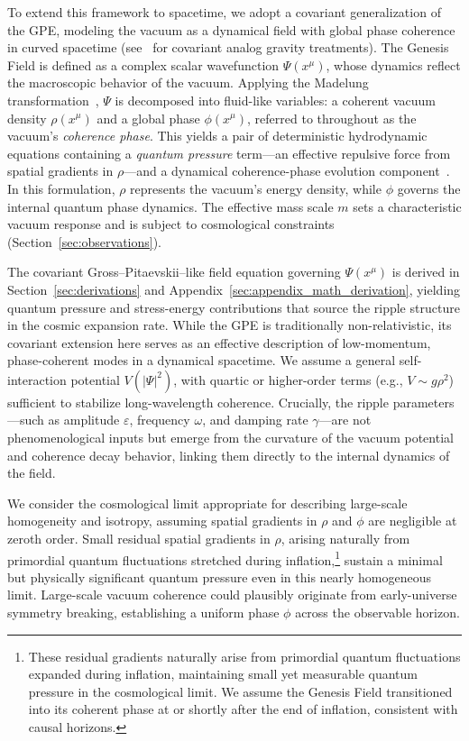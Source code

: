 To extend this framework to spacetime, we adopt a covariant generalization of the GPE, modeling the vacuum as a dynamical field with global phase coherence in curved spacetime (see~\cite{Barcelo2005,volovik2003universe} for covariant analog gravity treatments). The Genesis Field is defined as a complex scalar wavefunction \( \Psi(x^\mu) \), whose dynamics reflect the macroscopic behavior of the vacuum. Applying the Madelung transformation~\cite{Madelung1927}, \( \Psi \) is decomposed into fluid-like variables: a coherent vacuum density \( \rho(x^\mu) \) and a global phase \( \phi(x^\mu) \), referred to throughout as the vacuum’s \emph{coherence phase}. This yields a pair of deterministic hydrodynamic equations containing a \emph{quantum pressure} term—an effective repulsive force from spatial gradients in \( \rho \)—and a dynamical coherence-phase evolution component~\cite{volovik2003universe,Barcelo2005}. In this formulation, \( \rho \) represents the vacuum’s energy density, while \( \phi \) governs the internal quantum phase dynamics. The effective mass scale \( m \) sets a characteristic vacuum response and is subject to cosmological constraints (Section~\ref{sec:observations}).

The covariant Gross–Pitaevskii–like field equation governing \( \Psi(x^\mu) \) is derived in Section~\ref{sec:derivations} and Appendix~\ref{sec:appendix_math_derivation}, yielding quantum pressure and stress-energy contributions that source the ripple structure in the cosmic expansion rate. While the GPE is traditionally non-relativistic, its covariant extension here serves as an effective description of low-momentum, phase-coherent modes in a dynamical spacetime. We assume a general self-interaction potential \( V(|\Psi|^2) \), with quartic or higher-order terms (e.g., \( V \sim g \rho^2 \)) sufficient to stabilize long-wavelength coherence. Crucially, the ripple parameters—such as amplitude \( \varepsilon \), frequency \( \omega \), and damping rate \( \gamma \)—are not phenomenological inputs but emerge from the curvature of the vacuum potential and coherence decay behavior, linking them directly to the internal dynamics of the field.

We consider the cosmological limit appropriate for describing large-scale homogeneity and isotropy, assuming spatial gradients in \( \rho \) and \( \phi \) are negligible at zeroth order. Small residual spatial gradients in \( \rho \), arising naturally from primordial quantum fluctuations stretched during inflation,\footnote{These residual gradients naturally arise from primordial quantum fluctuations expanded during inflation, maintaining small yet measurable quantum pressure in the cosmological limit. We assume the Genesis Field transitioned into its coherent phase at or shortly after the end of inflation, consistent with causal horizons.} sustain a minimal but physically significant quantum pressure even in this nearly homogeneous limit. Large-scale vacuum coherence could plausibly originate from early-universe symmetry breaking, establishing a uniform phase \( \phi \) across the observable horizon.


